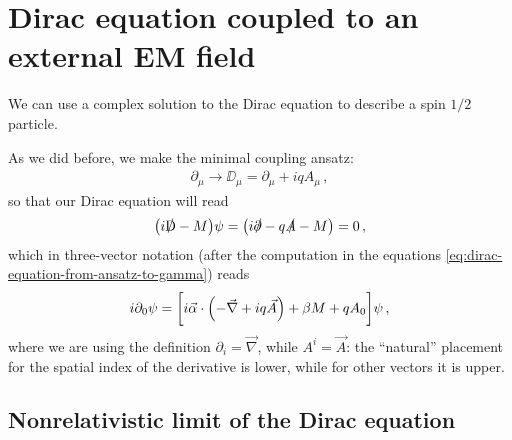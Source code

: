 \documentclass[main.tex]{subfiles}
\begin{document}
\section{Dirac equation coupled to an external EM field}


We can use a complex solution to the Dirac equation to describe a spin \(1/2\) particle.

As we did before, we make the minimal coupling ansatz: 
%
\begin{align}
\partial_{\mu } \to \DD_{\mu } = \partial_{\mu } + i q A_{\mu } 
\,,
\end{align}
%
so that our Dirac equation will read 
%
\begin{align}
\qty(i\slashed{\mathrm{D}} - M ) \psi = \qty(i \slashed{\partial} - q \slashed{A} - M ) = 0
\,,
\end{align}
%
which in three-vector notation (after the computation in the equations \eqref{eq:dirac-equation-from-ansatz-to-gamma}) reads 
%
\begin{align}
i \partial_0 \psi = \qty[i \vec{\alpha} \cdot \qty(- \vec{\nabla} + i q \vec{A}) + \beta M + q A_0 ] \psi 
\,,
\end{align}
%
where we are using the definition \(\partial_{i} = \vec{\nabla}\), while \(A^{i} = \vec{A} \): the ``natural'' placement for the spatial index of the derivative is lower, while for other vectors it is upper.

\subsection{Nonrelativistic limit of the Dirac equation}
\end{document}
